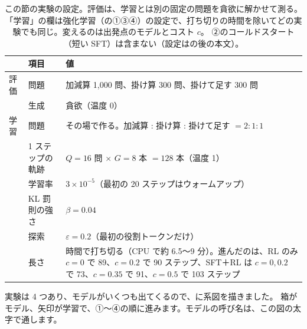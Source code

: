 \begin{table}[tbp]
\centering
\caption{この節の実験の設定。評価は、学習とは別の固定の問題を貪欲に解かせて測る。
「学習」の欄は強化学習（の①③④）の設定で、打ち切りの時間を除いてどの実験でも同じ。変えるのは出発点のモデルとコスト $c$。
②のコールドスタート（短い SFT）は含まない（設定はの後の本文）。}
\label{tab:arl-setup}
\small
\begin{tabular}{llp{78mm}}
\toprule
 & 項目 & 値 \\
\midrule
評価 & 問題 & 加減算 1,000 問、掛け算 300 問、掛けて足す 300 問 \\
 & 生成 & 貪欲（温度 0） \\
\midrule
学習 & 問題 & その場で作る。加減算 : 掛け算 : 掛けて足す $=2:1:1$ \\
 & 1 ステップの軌跡 & $Q=16$ 問 $\times$ $G=8$ 本 $=128$ 本（温度 1） \\
 & 学習率 & $3\times10^{-5}$（最初の 20 ステップはウォームアップ） \\
 & KL 罰則の強さ & $\beta=0.04$ \\
 & 探索 & $\varepsilon=0.2$（最初の役割トークンだけ） \\
 & 長さ & 時間で打ち切る（CPU で約 6.5〜9 分）。進んだのは、RL のみ $c=0$ で 89、$c=0.2$ で 90 ステップ、SFT＋RL は $c=0,0.2$ で 73、$c=0.35$ で 91、$c=0.5$ で 103 ステップ \\
\bottomrule
\end{tabular}
\end{table}

実験は 4 つあり、モデルがいくつも出てくるので、に系図を描きました。
箱がモデル、矢印が学習で、①〜④の順に進みます。モデルの呼び名は、この図の太字で通します。

